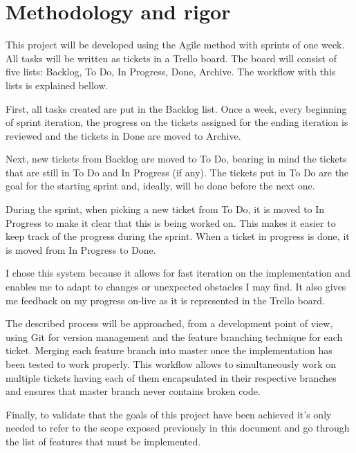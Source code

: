 \section{Methodology and rigor}

This project will be developed using the Agile\cite{agilemanifesto} method with sprints 
of one week. All tasks will be written as tickets in a Trello\cite{trello} board. 
The board will consist of five lists: Backlog, To Do, In Progress, Done, Archive. 
The workflow with this lists is explained bellow.

First, all tasks created are put in the Backlog list. Once a week, every beginning 
of sprint iteration, the progress on the tickets assigned for the ending iteration 
is reviewed and the tickets in Done are moved to Archive.

Next, new tickets from Backlog are moved to To Do, bearing in mind the tickets that 
are still in To Do and In Progress (if any). The tickets put in To Do are the goal 
for the starting sprint and, ideally, will be done before the next one.

During the sprint, when picking a new ticket from To Do, it is moved to In Progress 
to make it clear that this is being worked on. This makes it easier to keep track 
of the progress during the sprint. When a ticket in progress is done, it is moved 
from In Progress to Done.

I chose this system because it allows for fast iteration on the implementation and 
enables me to adapt to changes or unexpected obstacles I may find. It also gives me 
feedback on my progress on-live as it is represented in the Trello board.

The described process will be approached, from a development point of view, using 
Git for version management and the feature branching\cite{featurebranching} technique 
for each ticket. Merging each feature branch into master once the implementation has 
been tested to work properly.  This workflow allows to simultaneously work on multiple 
tickets having each of them encapsulated in their respective branches and ensures 
that master branch never contains broken code.

Finally, to validate that the goals of this project have been achieved it's only needed 
to refer to the scope exposed previously in this document and go through the list 
of features that must be implemented.
